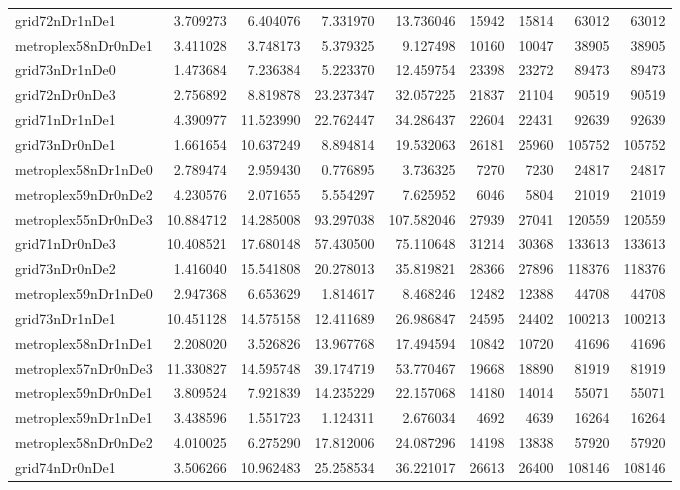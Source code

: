 \begin{longtable}{|l|r|r|r|r|r|r|r|r|}
grid72nDr1nDe1 & 3.709273 & 6.404076 & 7.331970 & 13.736046 & 15942 & 15814 & 63012 & 63012 \\
metroplex58nDr0nDe1 & 3.411028 & 3.748173 & 5.379325 & 9.127498 & 10160 & 10047 & 38905 & 38905 \\
grid73nDr1nDe0 & 1.473684 & 7.236384 & 5.223370 & 12.459754 & 23398 & 23272 & 89473 & 89473 \\
grid72nDr0nDe3 & 2.756892 & 8.819878 & 23.237347 & 32.057225 & 21837 & 21104 & 90519 & 90519 \\
grid71nDr1nDe1 & 4.390977 & 11.523990 & 22.762447 & 34.286437 & 22604 & 22431 & 92639 & 92639 \\
grid73nDr0nDe1 & 1.661654 & 10.637249 & 8.894814 & 19.532063 & 26181 & 25960 & 105752 & 105752 \\
metroplex58nDr1nDe0 & 2.789474 & 2.959430 & 0.776895 & 3.736325 & 7270 & 7230 & 24817 & 24817 \\
metroplex59nDr0nDe2 & 4.230576 & 2.071655 & 5.554297 & 7.625952 & 6046 & 5804 & 21019 & 21019 \\
metroplex55nDr0nDe3 & 10.884712 & 14.285008 & 93.297038 & 107.582046 & 27939 & 27041 & 120559 & 120559 \\
grid71nDr0nDe3 & 10.408521 & 17.680148 & 57.430500 & 75.110648 & 31214 & 30368 & 133613 & 133613 \\
grid73nDr0nDe2 & 1.416040 & 15.541808 & 20.278013 & 35.819821 & 28366 & 27896 & 118376 & 118376 \\
metroplex59nDr1nDe0 & 2.947368 & 6.653629 & 1.814617 & 8.468246 & 12482 & 12388 & 44708 & 44708 \\
grid73nDr1nDe1 & 10.451128 & 14.575158 & 12.411689 & 26.986847 & 24595 & 24402 & 100213 & 100213 \\
metroplex58nDr1nDe1 & 2.208020 & 3.526826 & 13.967768 & 17.494594 & 10842 & 10720 & 41696 & 41696 \\
metroplex57nDr0nDe3 & 11.330827 & 14.595748 & 39.174719 & 53.770467 & 19668 & 18890 & 81919 & 81919 \\
metroplex59nDr0nDe1 & 3.809524 & 7.921839 & 14.235229 & 22.157068 & 14180 & 14014 & 55071 & 55071 \\
metroplex59nDr1nDe1 & 3.438596 & 1.551723 & 1.124311 & 2.676034 & 4692 & 4639 & 16264 & 16264 \\
metroplex58nDr0nDe2 & 4.010025 & 6.275290 & 17.812006 & 24.087296 & 14198 & 13838 & 57920 & 57920 \\
grid74nDr0nDe1 & 3.506266 & 10.962483 & 25.258534 & 36.221017 & 26613 & 26400 & 108146 & 108146 \\

\end{longtable}
